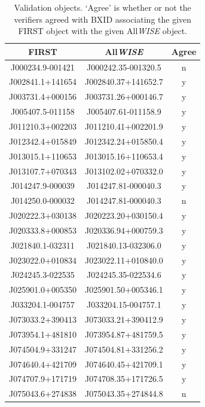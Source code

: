   \begin{table}
    \caption[Validation objects.]{\label{tab:verification-set} Validation objects. `Agree' is whether or not the verifiers agreed with BXID associating the given FIRST object with the given All\emph{WISE} object.}
        \scriptsize\centering
      \begin{tabular}{ccc}
        \hline\hline
        FIRST & All\emph{WISE} & Agree\\\hline
        J000234.9-001421 & J000242.35-001320.5 & n\\
        J002841.1+141654 & J002840.37+141652.7 & y\\
        J003731.4+000156 & J003731.26+000146.7 & y\\
        J005407.5-011158 & J005407.61-011158.9 & y\\
        J011210.3+002203 & J011210.41+002201.9 & y\\
        J012342.4+015849 & J012342.24+015850.4 & y\\
        J013015.1+110653 & J013015.16+110653.4 & y\\
        J013107.7+070343 & J013102.02+070332.0 & y\\
        J014247.9-000039 & J014247.81-000040.3 & y\\
        J014250.0-000032 & J014247.81-000040.3 & n\\
        J020222.3+030138 & J020223.20+030150.4 & y\\
        J020333.8+000853 & J020336.94+000759.3 & y\\
        J021840.1-032311 & J021840.13-032306.0 & y\\
        J023022.0+010834 & J023022.11+010840.0 & y\\
        J024245.3-022535 & J024245.35-022534.6 & y\\
        J025901.0+005350 & J025901.50+005346.1 & y\\
        J033204.1-004757 & J033204.15-004757.1 & y\\
        J073033.2+390413 & J073033.21+390412.9 & y\\
        J073954.1+481810 & J073954.87+481759.5 & y\\
        J074504.9+331247 & J074504.81+331256.2 & y\\
        J074640.4+421709 & J074640.45+421709.1 & y\\
        J074707.9+171719 & J074708.35+171726.5 & y\\
        J075043.6+274838 & J075043.35+274844.8 & n\\

\end{tabular}
\end{table}
